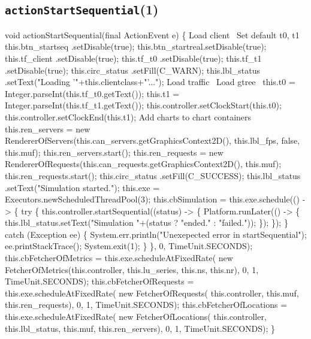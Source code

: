 \subsection{\texttt{actionStartSequential}(1)}
\nwenddocs{}\endmoddef{}
void actionStartSequential(final ActionEvent e) \{
  \LA{}Load client~{\nwtagstyle{}}\RA{}
  \LA{}Set default t0, t1~{\nwtagstyle{}}\RA{}
  this.btn_startseq .setDisable(true);
  this.btn_startreal.setDisable(true);
  this.tf_client     .setDisable(true);
  this.tf_t0        .setDisable(true);
  this.tf_t1        .setDisable(true);
  this.circ_status  .setFill(C_WARN);
  this.lbl_status   .setText("Loading '"+this.clientclass+"'...");
  \LA{}Load traffic~{\nwtagstyle{}}\RA{}
  \LA{}Load gtree~{\nwtagstyle{}}\RA{}
  this.t0 = Integer.parseInt(this.tf_t0.getText());
  this.t1 = Integer.parseInt(this.tf_t1.getText());
  this.controller.setClockStart(this.t0);
  this.controller.setClockEnd(this.t1);
  \LA{}Add charts to chart containers~{\nwtagstyle{}}\RA{}
  this.ren_servers = new RendererOfServers(this.can_servers.getGraphicsContext2D(), this.lbl_fps, false, this.muf);
  this.ren_servers.start();
  this.ren_requests = new RendererOfRequests(this.can_requests.getGraphicsContext2D(), this.muf);
  this.ren_requests.start();
  this.circ_status  .setFill(C_SUCCESS);
  this.lbl_status   .setText("Simulation started.");
  this.exe = Executors.newScheduledThreadPool(3);
  this.cbSimulation = this.exe.schedule(() -> \{
    try \{
      this.controller.startSequential((status) -> \{
        Platform.runLater(() -> \{
          this.lbl_status.setText("Simulation "+(status ? "ended." : "failed."));
        \});
      \});
    \} catch (Exception ee) \{
      System.err.println("Unexepected error in startSequential");
      ee.printStackTrace();
      System.exit(1);
    \}
  \}, 0, TimeUnit.SECONDS);
  this.cbFetcherOfMetrics = this.exe.scheduleAtFixedRate(
      new FetcherOfMetrics(this.controller, this.lu_series, this.ns, this.nr), 0, 1, TimeUnit.SECONDS);
  this.cbFetcherOfRequests = this.exe.scheduleAtFixedRate(
      new FetcherOfRequests(
        this.controller, this.muf, this.ren_requests), 0, 1, TimeUnit.SECONDS);
  this.cbFetcherOfLocations = this.exe.scheduleAtFixedRate(
      new FetcherOfLocations(
        this.controller, this.lbl_status, this.muf, this.ren_servers), 0, 1, TimeUnit.SECONDS);
\}
\eatline
{}\nwendcode{}\nwdocspar

